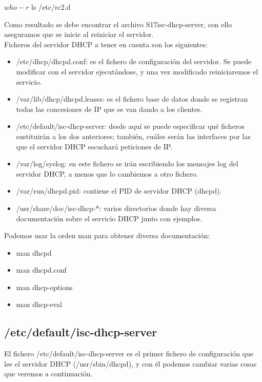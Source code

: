 	\begin{listing}[style=consola, numbers=none]
	$ who -r
	$ ls /etc/rc2.d
 	\end{listing}
	
	Como resultado se debe encontrar el archivo S17isc-dhcp-server, con ello aseguramos que se inicie al reiniciar el servidor.\\

Ficheros del servidor DHCP a tener en cuenta son los siguientes:
	\begin{itemize}
		\item /etc/dhcp/dhcpd.conf: es el fichero de configuración del servidor. Se puede modificar con el servidor ejecutándose, y una vez modificado reiniciaremos el servicio.
		\item /var/lib/dhcp/dhcpd.leases: es el fichero base de datos donde se registran todas las concesiones de IP que se van dando a los clientes.
		\item /etc/default/isc-dhcp-server: desde aquí se puede especificar qué ficheros sustituirán a los dos anteriores; también, cuáles serán las interfaces por las que el servidor DHCP escuchará peticiones de IP.
		\item /var/log/syslog: en este fichero se irán escribiendo los mensajes log del servidor DHCP, a menos que lo cambiemos a otro fichero.
		\item /var/run/dhcpd.pid: contiene el PID de servidor DHCP (dhcpd).
		\item /usr/share/doc/isc-dhcp-*: varios directorios donde hay diversa documentación sobre el servicio DHCP junto con ejemplos.
	\end{itemize}		

Podemos usar la orden man para obtener diversa documentación:

	\begin{itemize}
		\item man dhcpd
		\item man dhcpd.conf
		\item man dhcp-options
		\item man dhcp-eval
	\end{itemize}		

\subsection{/etc/default/isc-dhcp-server}
El fichero /etc/default/isc-dhcp-server es el primer fichero de configuración que lee el servidor DHCP (/usr/sbin/dhcpd), y con él podemos cambiar varias cosas que veremos a continuación.

